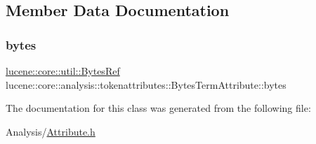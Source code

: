 \subsection{Member Data Documentation}
\mbox{\label{classlucene_1_1core_1_1analysis_1_1tokenattributes_1_1BytesTermAttribute_adf534bc1c061247d7802bdb765236b89}} 
\subsubsection{\texorpdfstring{bytes}{bytes}}
{\footnotesize\ttfamily \mbox{\hyperlink{classlucene_1_1core_1_1util_1_1BytesRef}{lucene\+::core\+::util\+::\+Bytes\+Ref}} lucene\+::core\+::analysis\+::tokenattributes\+::\+Bytes\+Term\+Attribute\+::bytes\hspace{0.3cm}{\ttfamily [private]}}



The documentation for this class was generated from the following file\+:\begin{DoxyCompactItemize}
\item 
Analysis/\mbox{\hyperlink{Analysis_2Attribute_8h}{Attribute.\+h}}\end{DoxyCompactItemize}
